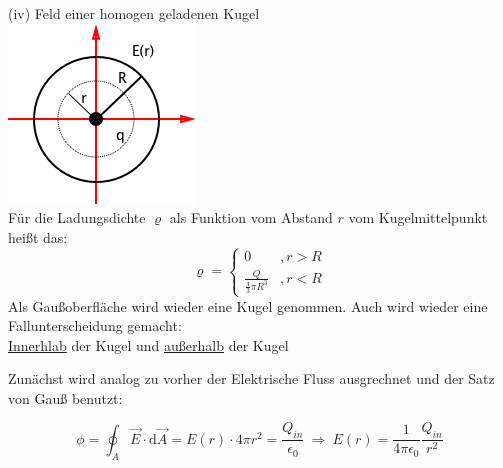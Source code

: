 \documentclass[11pt]{article}
\begin{document}
\newpage

(iv) Feld einer homogen geladenen Kugel\\

\includegraphics{skizzen/14/14_6B6}\\

Für die Ladungsdichte $\varrho$ als Funktion vom Abstand $r$ vom Kugelmittelpunkt heißt das:
\[
     \varrho=\left\{\begin{array}{ll} 0 & ,r>R \\
         \frac{Q}{\frac{4}{3}\pi R^3} & ,r<R\end{array}\right.
  \]
Als Gaußoberfläche wird wieder eine Kugel genommen. Auch wird wieder eine Fallunterscheidung gemacht:\\
\underline{Innerhlab} der Kugel und \underline{außerhalb} der Kugel

Zunächst wird analog zu vorher der Elektrische Fluss ausgrechnet und der Satz von Gauß benutzt:

$$ \phi=\oint_{A}\vec{E}\cdot\mathrm{d}\vec{A} = E(r)\cdot4\pi r^2=\frac{Q_{in}}{\epsilon_0}\ \Rightarrow\ E(r)=\frac{1}{4\pi\epsilon_0}\frac{Q_{in}}{r^2}$$
\end{document}
